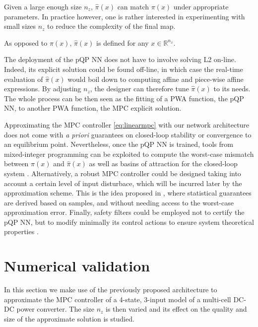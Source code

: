 \begin{remark}
	Given a large enough size $n_z$, $\hat\pi(x)$ can match $\pi(x)$ under appropriate parameters. In practice however, one is rather interested in experimenting with small sizes $n_z$ to reduce the complexity of the final map.
\end{remark}

\begin{remark}
	As opposed to $\pi(x)$, $\hat\pi(x)$ is defined for any $x \in \mathbb{R}^{n_x}$.
\end{remark}

The deployment of the pQP NN does not have to involve solving L2 on-line. Indeed, its explicit solution could be found off-line, in which case the real-time evaluation of $\hat\pi(x)$ would boil down to computing affine and piece-wise affine expressions. By adjusting $n_z$, the designer can therefore tune $\hat\pi(x)$ to its needs. The whole process can be then seen as the fitting of a PWA function, the pQP NN, to another PWA function, the MPC explicit solution.

Approximating the MPC controller \eqref{eq:linearmpc} with our network architecture does not come with \textit{a priori} guarantees on closed-loop stability or convergence to an equilibrium point. Nevertheless, once the pQP NN is trained, tools from mixed-integer programming can be exploited to compute the worst-case mismatch between $\pi(x)$ and $\hat\pi(x)$ as well as basins of attraction for the closed-loop system \citep{schwan2022stability}. Alternatively, a robust MPC controller could be designed taking into account a certain level of input disturbace, which will be incurred later by the approximation scheme. This is the idea proposed in \cite{hertneck2018learning}, where statistical guarantees are derived based on samples, and without needing access to the worst-case approximation error. Finally, safety filters could be employed not to certify the pQP NN, but to modify minimally its control actions to ensure system theoretical properties \citep{wabersich2018linear}.

\section{Numerical validation}

In this section we make use of the previously proposed architecture to approximate the MPC controller of a 4-state, 3-input model of a multi-cell DC-DC power converter. The size $n_z$ is then varied and its effect on the quality and size of the approximate solution is studied.

